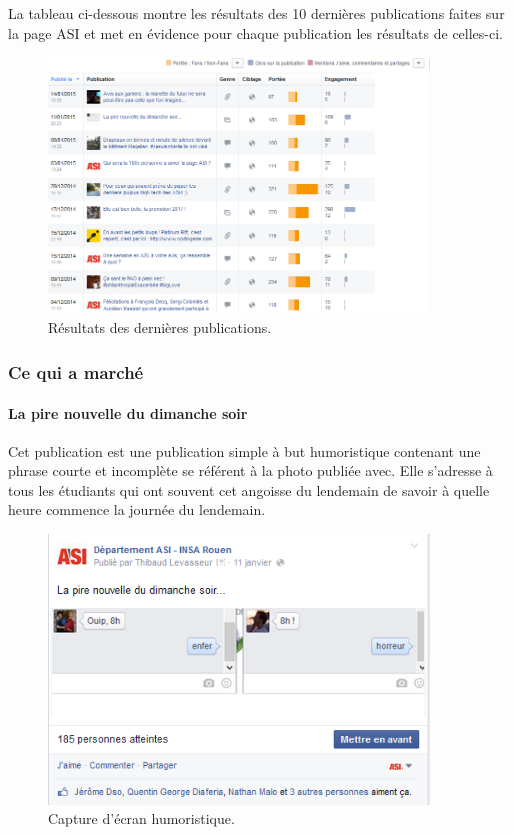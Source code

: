 La tableau ci-dessous montre les résultats des 10 dernières publications faites sur la page ASI et met en évidence pour chaque publication les résultats de celles-ci.

\begin{figure}
	\begin{center}
		\includegraphics[width=0.90\textwidth]{images/DernierePublication.png}
		\caption{Résultats des dernières publications.}
	\end{center}
\end{figure}

\subsubsection{Ce qui a marché}
\paragraph{La pire nouvelle du dimanche soir}
Cet publication est une publication simple à but humoristique contenant une phrase courte et incomplète se référent à la photo publiée avec. Elle s'adresse à tous les étudiants qui ont souvent cet angoisse du lendemain de savoir à quelle heure commence la journée du lendemain.
\begin{figure}
	\begin{center}
		\includegraphics[width=0.90\textwidth]{images/laPireNouvelle.png}
		\caption{Capture d'écran humoristique.}
	\end{center}
\end{figure}

